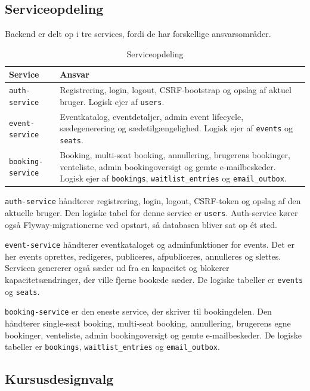 \documentclass[11pt,a4paper]{article}
\newcommand{\code}[1]{\texttt{#1}}
\begin{document}
\subsection{Serviceopdeling}

Backend er delt op i tre services, fordi de har forskellige ansvarsområder.

\begin{table}[h]
\centering
\caption{Serviceopdeling}
\begin{tabularx}{\textwidth}{@{}L{3.2cm}Y@{}}
\toprule
Service & Ansvar \\
\midrule
\code{auth-service} & Registrering, login, logout, CSRF-bootstrap og opslag af aktuel bruger. Logisk ejer af \code{users}. \\
\code{event-service} & Eventkatalog, eventdetaljer, admin event lifecycle, sædegenerering og sædetilgængelighed. Logisk ejer af \code{events} og \code{seats}. \\
\code{booking-service} & Booking, multi-seat booking, annullering, brugerens bookinger, venteliste, admin bookingoversigt og gemte e-mailbeskeder. Logisk ejer af \code{bookings}, \code{waitlist\_entries} og \code{email\_outbox}. \\
\bottomrule
\end{tabularx}
\end{table}

\code{auth-service} håndterer registrering, login, logout, CSRF-token og opslag af den aktuelle bruger. Den logiske tabel for denne service er \code{users}. Auth-service kører også Flyway-migrationerne ved opstart, så databasen bliver sat op ét sted.

\code{event-service} håndterer eventkataloget og adminfunktioner for events. Det er her events oprettes, redigeres, publiceres, afpubliceres, annulleres og slettes. Servicen genererer også sæder ud fra en kapacitet og blokerer kapacitetsændringer, der ville fjerne bookede sæder. De logiske tabeller er \code{events} og \code{seats}.

\code{booking-service} er den eneste service, der skriver til bookingdelen. Den håndterer single-seat booking, multi-seat booking, annullering, brugerens egne bookinger, venteliste, admin bookingoversigt og gemte e-mailbeskeder. De logiske tabeller er \code{bookings}, \code{waitlist\_entries} og \code{email\_outbox}.

\subsection{Kursusdesignvalg}
\end{document}
